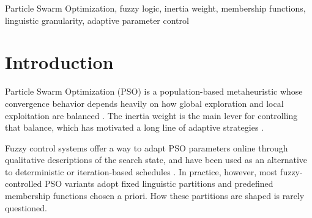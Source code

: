 \documentclass[conference]{IEEEtran}
\begin{document}
\begin{abstract}
This study investigates the impact of input membership function design on the performance of a fuzzy-controlled Particle Swarm Optimization (PSO). Although fuzzy PSO research has typically adopted input partitions without systematic comparison, this work isolates the effect of varying the linguistic representation of iteration progress and population diversity by holding the output set and rule base constant. Four input set geometries crossed with two granularity levels are evaluated on six benchmark functions spanning unimodal and multimodal problem types. Results show a problem-type-dependent pattern: on unimodal functions the baseline PSO with linear inertia weight outperforms all fuzzy variants, whereas on the multimodal problems tested the fuzzy controller improves mean fitness by up to 22.9\% and reduces variability by up to 63\%. Within the fuzzy-controlled variants, the choice of input partition geometry measurably affects performance, with moderate-overlap configurations and three-label granularity yielding the most robust results across the benchmark suite.
\end{abstract}

\begin{IEEEkeywords}
Particle Swarm Optimization, fuzzy logic, inertia weight, membership functions, linguistic granularity, adaptive parameter control
\end{IEEEkeywords}


\section{Introduction}

Particle Swarm Optimization (PSO) is a population-based metaheuristic whose convergence behavior depends heavily on how global exploration and local exploitation are balanced \cite{kennedy1995particle}. The inertia weight is the main lever for controlling that balance, which has motivated a long line of adaptive strategies \cite{shi1998modified}.

Fuzzy control systems offer a way to adapt PSO parameters online through qualitative descriptions of the search state, and have been used as an alternative to deterministic or iteration-based schedules \cite{shi2001fuzzy}. In practice, however, most fuzzy-controlled PSO variants adopt fixed linguistic partitions and predefined membership functions chosen a priori. How these partitions are shaped is rarely questioned.
\end{document}
